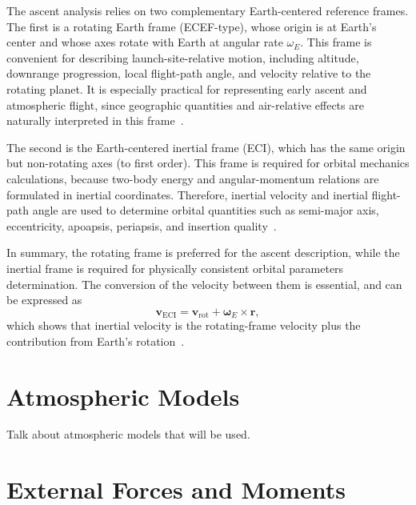 The ascent analysis relies on two complementary Earth-centered reference frames.  
The first is a rotating Earth frame (ECEF-type), whose origin is at Earth’s center and whose axes rotate with Earth at angular rate $\omega_E$. This frame is convenient for describing launch-site-relative motion, including altitude, downrange progression, local flight-path angle, and velocity relative to the rotating planet. It is especially practical for representing early ascent and atmospheric flight, since geographic quantities and air-relative effects are naturally interpreted in this frame~\cite{relativityframes}.

The second is the Earth-centered inertial frame (ECI), which has the same origin but non-rotating axes (to first order). This frame is required for orbital mechanics calculations, because two-body energy and angular-momentum relations are formulated in inertial coordinates. Therefore, inertial velocity and inertial flight-path angle are used to determine orbital quantities such as semi-major axis, eccentricity, apoapsis, periapsis, and insertion quality~\cite{relativityframes}.

In summary, the rotating frame is preferred for the ascent description, while the inertial frame is required for physically consistent orbital parameters determination. The conversion of the velocity between them is essential, and can be expressed as
\[
\mathbf{v}_{\mathrm{ECI}}=\mathbf{v}_{\mathrm{rot}}+\boldsymbol{\omega}_E\times\mathbf{r},
\]
which shows that inertial velocity is the rotating-frame velocity plus the contribution from Earth’s rotation~\cite{relativityframes}.


\section{Atmospheric Models}
\label{sec:atm_models}

Talk about atmospheric models that will be used.


\section{External Forces and Moments}
\label{sec:External_Forces_Moments}

